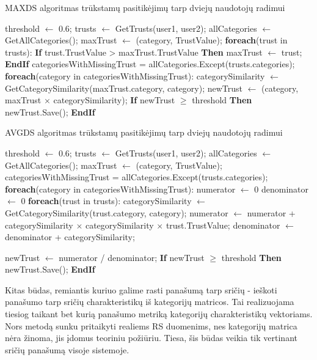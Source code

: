 \documentclass{VUMIFInfMagistrinis}
\begin{document}
\begin{algorithm}
	\caption{MAXDS algoritmas trūkstamų pasitikėjimų tarp dviejų naudotojų radimui}\label{MAXDSalg}
	\begin{algorithmic}[1]
		\State threshold $\gets$ 0.6;
		\State trusts $\gets$ GetTrusts(user1, user2);
		\State allCategories $\gets$ GetAllCategories();
		\State maxTrust $\gets$ (category, TrustValue);
		\State \textbf{foreach}(trust in trusts):
		\State \indent \textbf{If} {trust.TrustValue > maxTrust.TrustValue}  \textbf{Then}
		\State \indent \indent   maxTrust $\gets$ trust;
		\State \indent \textbf{EndIf}
		\State categoriesWithMissingTrust = allCategories.Except(trusts.categories);
		\State \textbf{foreach}(category in categoriesWithMissingTrust):
		\State \indent categorySimilarity $\gets$ GetCategorySimilarity(maxTrust.category, category);
		\State \indent newTrust $\gets$ (category, maxTrust $\times$ categorySimilarity);
		\State \indent \textbf{If} {newTrust $\ge$ threshold} \textbf{Then}
		\State \indent \indent newTrust.Save();
		\State \indent \textbf{EndIf}
		\EndProcedure
	\end{algorithmic}
\end{algorithm}

\begin{algorithm}
	\caption{AVGDS algoritmas trūkstamų pasitikėjimų tarp dviejų naudotojų radimui}\label{AVGDSalg}
	\begin{algorithmic}[1]
		\State threshold $\gets$ 0.6;
		\State trusts $\gets$ GetTrusts(user1, user2);
		\State allCategories $\gets$ GetAllCategories();
		\State maxTrust $\gets$ (category, TrustValue);
		\State categoriesWithMissingTrust = allCategories.Except(trusts.categories);
		\State \textbf{foreach}(category in categoriesWithMissingTrust):
		\State \indent numerator $\gets$ 0
		\State \indent denominator $\gets$ 0
		\State \indent \textbf{foreach}(trust in trusts):
		\State \indent \indent categorySimilarity $\gets$ GetCategorySimilarity(trust.category, category);
		\State \indent \indent numerator $\gets$ numerator + categorySimilarity $\times$ categorySimilarity $\times$ trust.TrustValue;
		\State \indent \indent denominator $\gets$ denominator + categorySimilarity;
		
		\State \indent newTrust $\gets$ numerator / denominator;
		\State \indent \textbf{If} {newTrust $\ge$ threshold} \textbf{Then}
		\State \indent \indent newTrust.Save();
		\State \indent \textbf{EndIf}
		\EndProcedure
	\end{algorithmic}
\end{algorithm}
\indent Kitas būdas, remiantis kuriuo galime rasti panašumą tarp sričių - ieškoti panašumo tarp sričių charakteristikų iš kategorijų matricos. Tai realizuojama tiesiog taikant bet kurią panašumo metriką kategorijų charakteristikų vektoriams. Nors metodą sunku pritaikyti realiems RS duomenims, nes kategorijų matrica nėra žinoma, jis įdomus teoriniu požiūriu. Tiesa, šis būdas veikia tik vertinant sričių panašumą visoje sistemoje.
\end{document}
